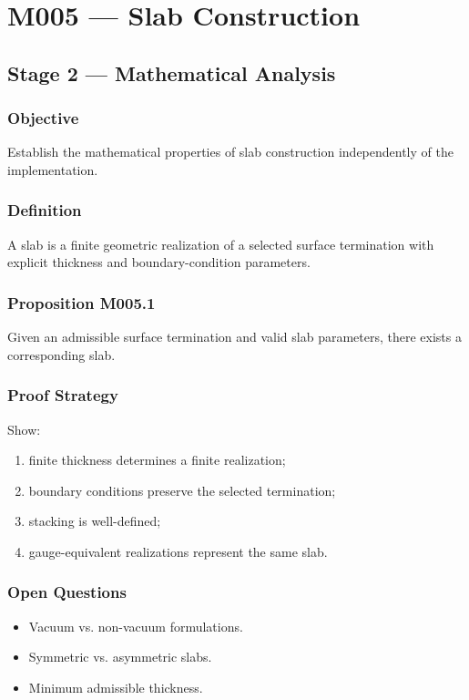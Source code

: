 \chapter{M005 --- Slab Construction}

\section{Stage 2 --- Mathematical Analysis}

\subsection{Objective}

Establish the mathematical properties of slab construction
independently of the implementation.

\subsection{Definition}

A slab is a finite geometric realization of a selected surface
termination with explicit thickness and boundary-condition parameters.

\subsection{Proposition M005.1}

Given an admissible surface termination and valid slab parameters,
there exists a corresponding slab.

\subsection{Proof Strategy}

Show:
\begin{enumerate}
\item finite thickness determines a finite realization;
\item boundary conditions preserve the selected termination;
\item stacking is well-defined;
\item gauge-equivalent realizations represent the same slab.
\end{enumerate}

\subsection{Open Questions}

\begin{itemize}
\item Vacuum vs. non-vacuum formulations.
\item Symmetric vs. asymmetric slabs.
\item Minimum admissible thickness.
\end{itemize}
